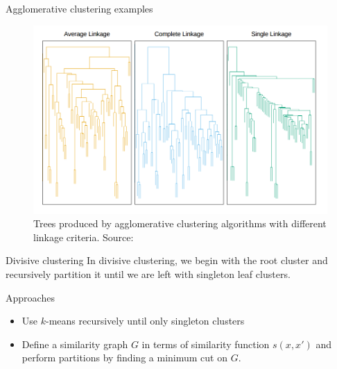 \documentclass[10pt, compress]{beamer}
\begin{document}
\begin{frame}{Agglomerative clustering examples}
  \begin{figure}
    \includegraphics[frame,width=\textwidth]{img/dendrograms}
    \caption{Trees produced by agglomerative clustering algorithms
    with different linkage criteria. Source: \cite{Hastie2009}}
    \label{fig:dendrograms}
  \end{figure}
\end{frame}

\begin{frame}{Divisive clustering}
  In divisive clustering, we begin with the root cluster
  and recursively partition it until we are left with
  singleton leaf clusters.

  \begin{block}{Approaches}
    \begin{itemize}
    \item Use $k$-means recursively until only singleton clusters
    \item Define a similarity graph $G$ in terms of similarity function $s(x, x')$
      and perform partitions by finding a minimum cut on $G$.
    \end{itemize}
  \end{block}
\end{frame}
\end{document}
